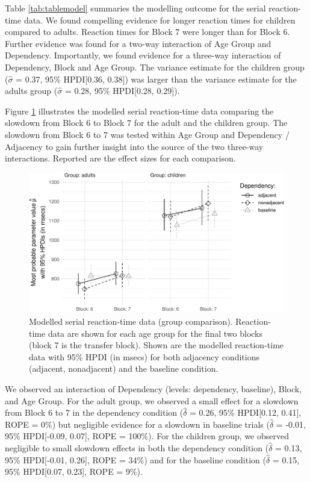 \documentclass[
  english,
  man,floatsintext]{apa7}
\begin{document}
Table \ref{tab:tablemodel} summaries the modelling outcome for the serial reaction-time data. We found compelling evidence for longer reaction times for children compared to adults. Reaction times for Block 7 were longer than for Block 6. Further evidence was found for a two-way interaction of Age Group and Dependency. Importantly, we found evidence for a three-way interaction of Dependency, Block and Age Group. The variance estimate for the children group (\(\hat{\sigma}\) = 0.37, 95\% HPDI{[}0.36, 0.38{]}) was larger than the variance estimate for the adults group (\(\hat{\sigma}\) = 0.28, 95\% HPDI{[}0.28, 0.29{]}).

Figure \ref{fig:plotgroupcomp} illustrates the modelled serial reaction-time data comparing the slowdown from Block 6 to Block 7 for the adult and the children group. The slowdown from Block 6 to 7 was tested within Age Group and Dependency / Adjacency to gain further insight into the source of the two three-way interactions. Reported are the effect sizes for each comparison.

\begin{figure}[ht]

{\centering \includegraphics{Group-comparison_files/figure-latex/plotgroupcomp-1} 

}

\caption{Modelled serial reaction-time data (group comparison). Reaction-time data are shown for each age group for the final two blocks (block 7 is the transfer block). Shown are the modelled reaction-time data with 95\% HPDI (in msecs) for both adjacency conditions (adjacent, nonadjacent) and the baseline condition.}\label{fig:plotgroupcomp}
\end{figure}

We observed an interaction of Dependency (levels: dependency, baseline), Block, and Age Group. For the adult group, we observed a small effect for a slowdown from Block 6 to 7 in the dependency condition (\(\hat{\delta}\) = 0.26, 95\% HPDI{[}0.12, 0.41{]}, ROPE = 0\%) but negligible evidence for a slowdown in baseline trials (\(\hat{\delta}\) = -0.01, 95\% HPDI{[}-0.09, 0.07{]}, ROPE = 100\%). For the children group, we observed negligible to small slowdown effects in both the dependency condition (\(\hat{\delta}\) = 0.13, 95\% HPDI{[}-0.01, 0.26{]}, ROPE = 34\%) and for the baseline condition (\(\hat{\delta}\) = 0.15, 95\% HPDI{[}0.07, 0.23{]}, ROPE = 9\%).
\end{document}
